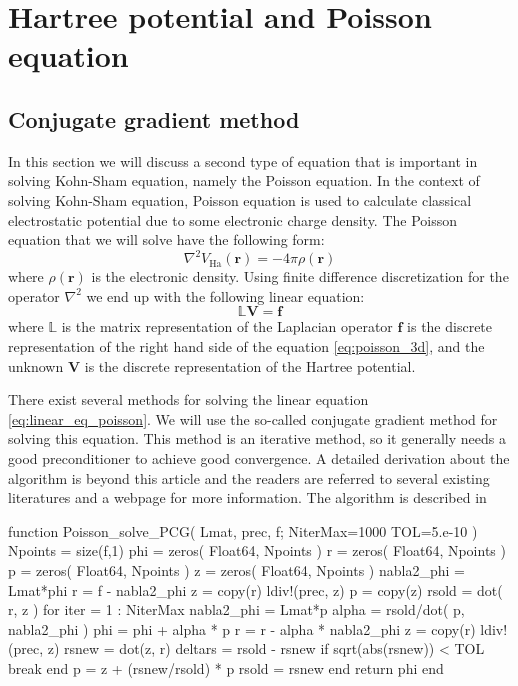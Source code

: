\chapter{Hartree potential and Poisson equation}
\label{chap:poisson_3d}

\section{Conjugate gradient method}

In this section we will discuss a second type of equation
that is important in solving Kohn-Sham equation,
namely the Poisson equation. In the
context of solving Kohn-Sham equation, Poisson equation is used to
calculate classical electrostatic potential due to some electronic
charge density.
The Poisson equation that we will solve have the following form:
\begin{equation}
\nabla^2 V_{\mathrm{Ha}}(\mathbf{r}) = -4\pi\rho(\mathbf{r})
\label{eq:poisson_3d}
\end{equation}
where $\rho(\mathbf{r})$ is the electronic density. Using finite
difference discretization for the operator $\nabla^2$ we end up with
the following linear equation:
\begin{equation}
\mathbb{L} \mathbf{V} = \mathbf{f}
\label{eq:linear_eq_poisson}
\end{equation}
where $\mathbb{L}$ is the matrix representation of the Laplacian operator
$\mathbf{f}$ is the discrete representation of the right hand side of the equation
\ref{eq:poisson_3d}, and the unknown $\mathbf{V}$ is the discrete representation of
the Hartree potential.

There exist several methods for solving the linear equation \ref{eq:linear_eq_poisson}.
We will use the so-called conjugate gradient method for solving this equation.
This method is an iterative method, so it generally needs a good preconditioner to
achieve good convergence. A detailed derivation about the algorithm is beyond this
article and the readers are referred to several existing literatures \cite{Hestenes1952,Shewchuk1994}
and a webpage \cite{wiki-Conjugate-gradient} for more
information. The algorithm is described in 

\begin{juliacode}
function Poisson_solve_PCG( Lmat, prec, f; NiterMax=1000 TOL=5.e-10 )
  Npoints = size(f,1)
  phi = zeros( Float64, Npoints )
  r = zeros( Float64, Npoints )
  p = zeros( Float64, Npoints )
  z = zeros( Float64, Npoints )
  nabla2_phi = Lmat*phi
  r = f - nabla2_phi
  z = copy(r)
  ldiv!(prec, z)
  p = copy(z)
  rsold = dot( r, z )
  for iter = 1 : NiterMax
    nabla2_phi = Lmat*p
    alpha = rsold/dot( p, nabla2_phi )
    phi = phi + alpha * p
    r = r - alpha * nabla2_phi
    z = copy(r)
    ldiv!(prec, z)
    rsnew = dot(z, r)
    deltars = rsold - rsnew
    if sqrt(abs(rsnew)) < TOL
      break
    end
    p = z + (rsnew/rsold) * p
    rsold = rsnew
  end
  return phi
end
\end{juliacode}

